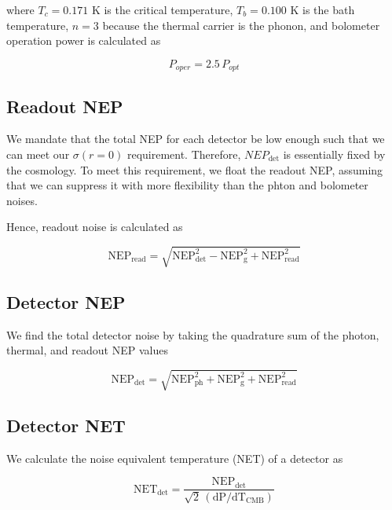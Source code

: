 \documentclass[12pt, titlepage]{article} %
\begin{document}
where $T_{c} = 0.171$ K is the critical temperature, $T_{b} = 0.100$ K is the bath temperature, $n = 3$ because the thermal carrier is the phonon, and bolometer operation power is calculated as 

\begin{equation}
	P_{oper} = 2.5 \, P_{opt}
\end{equation}


\subsection{Readout NEP}

We mandate that the total NEP for each detector be low enough such that we can meet our $\sigma(r=0)$ requirement. Therefore, $NEP_{\mathrm{det}}$ is essentially fixed by the cosmology. To meet this requirement, we float the readout NEP, assuming that we can suppress it with more flexibility than the phton and bolometer noises. 

Hence, readout noise is calculated as 

\begin{equation}
	\mathrm{NEP_{read}} = \sqrt{\mathrm{NEP_{det}^{2} - NEP_{g}^{2} + NEP_{read}^{2}}}
\end{equation}


\subsection{Detector NEP}

We find the total detector noise by taking the quadrature sum of the photon, thermal, and readout NEP values

\begin{equation}
	\mathrm{NEP_{det}} = \sqrt{\mathrm{NEP_{ph}^{2} + NEP_{g}^{2} + NEP_{read}^{2}}}
\end{equation}


\subsection{Detector NET}

We calculate the noise equivalent temperature (NET) of a detector as \cite{kamThesis}

\begin{equation}
	\mathrm{NET_{det}} = \frac{\mathrm{NEP_{det}}}{\sqrt{2} \, (\mathrm{dP/dT_{CMB}})}
\end{equation}
\end{document}
